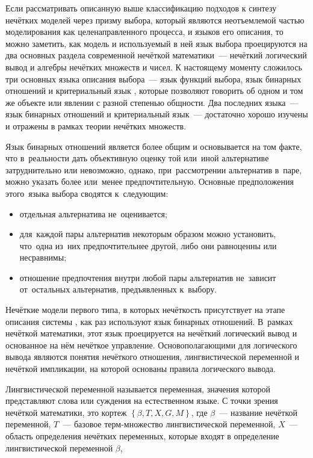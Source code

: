Если рассматривать описанную выше классификацию подходов к синтезу нечётких моделей через призму выбора, который являются неотъемлемой частью моделирования как целенаправленного процесса, и языков его описания, то можно заметить, как модель и используемый в ней язык выбора проецируются на два основных раздела современной нечёткой математики~--- нечёткий логический вывод и алгебры нечётких множеств и чисел. К настоящему моменту сложилось три основных языка описания выбора~--- язык функций выбора, язык бинарных отношений и критериальный язык \cite{Choice_Languages}, которые позволяют говорить об одном и том же объекте или явлении с разной степенью общности. Два последних языка~--- язык бинарных отношений и критериальный язык~--- достаточно хорошо изучены и отражены в рамках теории нечётких множеств.

Язык бинарных отношений является более общим и основывается на том факте, что в~реальности дать объективную оценку той или~иной альтернативе затруднительно или невозможно, однако, при~рассмотрении альтернатив в~паре, можно указать более или~менее предпочтительную. Основные предположения этого~языка выбора сводятся к~следующим:
\begin{itemize}
	\item отдельная альтернатива не~оценивается;
	\item для~каждой пары альтернатив некоторым образом можно установить, что~одна из~них предпочтительнее другой, либо они равноценны или несравнимы;
	\item отношение предпочтения внутри любой пары альтернатив не~зависит от~остальных альтернатив, предъявленных к~выбору.
\end{itemize}

Нечёткие модели первого типа, в которых нечёткость присутствует на этапе описания системы \cite{Choice_Languages}, как раз используют язык бинарных отношений. В~рамках нечёткой математики, этот язык проецируется на нечёткий логический вывод и основанное на нём нечёткое управление. Основополагающими для логического вывода являются понятия нечёткого отношения, лингвистической переменной и нечёткой импликации, на которой основаны правила логического вывода.

\begin{mydef}
Лингвистической переменной называется переменная, значения которой представляют слова или суждения на естественном языке. С точки зрения нечёткой математики, это кортеж $\left\lbrace \beta, T, X, G, M \right\rbrace$, где $\beta$~--- название нечёткой переменной, $T$~--- базовое терм-множество лингвистической переменной, $X$~--- область определения нечётких переменных, которые входят в определение лингвистической переменной $\beta$,
\end{mydef}




